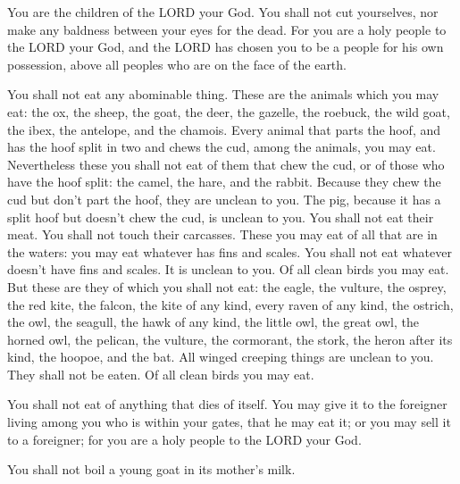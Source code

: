\mychapter{} \myverse*{}You are the children of the LORD your God. You shall not cut yourselves,
nor make any baldness between your eyes for the dead.
\myverse{}For you are a holy people to the LORD your God, and the LORD has chosen you
to be a people for his own possession, above all peoples who are on the face of the earth.


\myverse{}You shall not eat any abominable thing.
\myverse{}These are the animals which you may eat: the ox, the sheep, the goat,
\myverse{}the deer, the gazelle, the roebuck, the wild goat, the ibex, the antelope,
and the chamois.
\myverse{}Every animal that parts the hoof, and has the hoof split in two and chews the
cud, among the animals, you may eat.
\myverse{}Nevertheless these you shall not eat of them that chew the cud, or of those
who have the hoof split: the camel, the hare, and the rabbit. Because they chew the cud but don’t part
the hoof, they are unclean to you.
\myverse{}The pig, because it has a split hoof but doesn’t chew the cud, is unclean to
you. You shall not eat their meat. You shall not touch their carcasses.
\myverse{}These you may eat of all that are in the waters: you may eat whatever has fins
and scales.
\myverse{}You shall not eat whatever doesn’t have fins and scales. It is unclean to
you.
\myverse{}Of all clean birds you may eat.
\myverse{}But these are they of which you shall not eat: the eagle, the vulture, the
osprey,
\myverse{}the red kite, the falcon, the kite of any kind,
\myverse{}every raven of any kind,
\myverse{}the ostrich, the owl, the seagull, the hawk of any kind,
\myverse{}the little owl, the great owl, the horned owl,
\myverse{}the pelican, the vulture, the cormorant,
\myverse{}the stork, the heron after its kind, the hoopoe, and the bat.
\myverse{}All winged creeping things are unclean to you. They shall not be eaten.
\myverse{}Of all clean birds you may eat.


\myverse{}You shall not eat of anything that dies of itself. You may give
it to the foreigner living among you who is within your gates, that he may eat it; or you may sell it
to a foreigner; for you are a holy people to the LORD your God.

You shall not boil a young goat in its mother’s milk.


